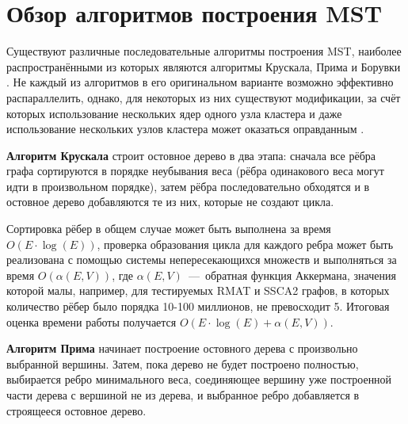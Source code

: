 \documentclass[a4paper,10pt]{extarticle}
\begin{document}

\section{Обзор алгоритмов построения MST}
Существуют различные последовательные алгоритмы построения MST, наиболее распространёнными из которых являются алгоритмы Крускала, Прима и Борувки \cite{cormen}.
Не каждый из алгоритмов в его оригинальном варианте возможно эффективно распараллелить, однако, для некоторых из них существуют модификации, за счёт которых использование нескольких ядер одного узла кластера и даже использование нескольких узлов кластера может оказаться оправданным \cite{boruvka-prima,kruskal-parallel}.


\textbf{Алгоритм Крускала} строит остовное дерево в два этапа: сначала все рёбра графа сортируются в порядке неубывания веса (рёбра одинакового веса могут идти в произвольном порядке), затем рёбра последовательно обходятся и в остовное дерево добавляются те из них, которые не создают цикла.

Сортировка рёбер в общем случае может быть выполнена за время $O(E \cdot \log(E))$, проверка образования цикла для каждого ребра может быть реализована с помощью системы непересекающихся множеств и выполняться за время $O(\alpha(E, V))$, где $\alpha(E, V)$~---~обратная функция Аккермана, значения которой малы, например, для тестируемых RMAT и SSCA2 графов, в которых количество рёбер было порядка 10-100 миллионов, не превосходит 5. Итоговая оценка времени работы получается $O(E \cdot \log(E) + \alpha(E, V))$.


\textbf{Алгоритм Прима} начинает построение остовного дерева с произвольно выбранной вершины. Затем, пока дерево не будет построено полностью, выбирается ребро минимального веса, соединяющее вершину уже построенной части дерева с вершиной не из дерева, и выбранное ребро добавляется в строящееся остовное дерево.
\end{document}

